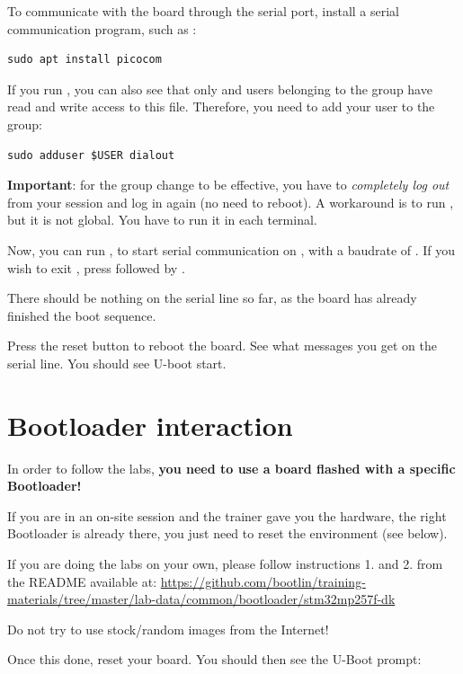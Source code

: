 To communicate with the board through the serial port, install a
serial communication program, such as :

\begin{verbatim}
sudo apt install picocom
\end{verbatim}

If you run , you can also see that only
 and users belonging to the  group have
read and write access to this file. Therefore, you need to add your user
to the  group:

\begin{verbatim}
sudo adduser $USER dialout
\end{verbatim}

{\bf Important}: for the group change to be effective, you have to
{\em completely log out} from your session and log in again (no need to
reboot). A workaround is to run , but it is not global.
You have to run it in each terminal.

Now, you can run , to start serial
communication on , with a baudrate of . If
you wish to exit , press \code{[Ctrl][a]} followed by
\code{[Ctrl][x]}.

There should be nothing on the serial line so far, as the board has
already finished the boot sequence.

Press the reset button to reboot the board. See what messages
you get on the serial line. You should see U-boot
start.

\section{Bootloader interaction}

In order to follow the labs, {\bf you need to use a board flashed
with a specific Bootloader!}

If you are in an on-site session and the trainer gave you the hardware,
the right Bootloader is already there, you just need to reset the
environment (see below).

If you are doing the labs on your own, please follow instructions 1. and
2. from the README available at:
\url{https://github.com/bootlin/training-materials/tree/master/lab-data/common/bootloader/stm32mp257f-dk}

Do not try to use stock/random images from the Internet!

Once this done, reset your board.
You should then see the U-Boot prompt:

